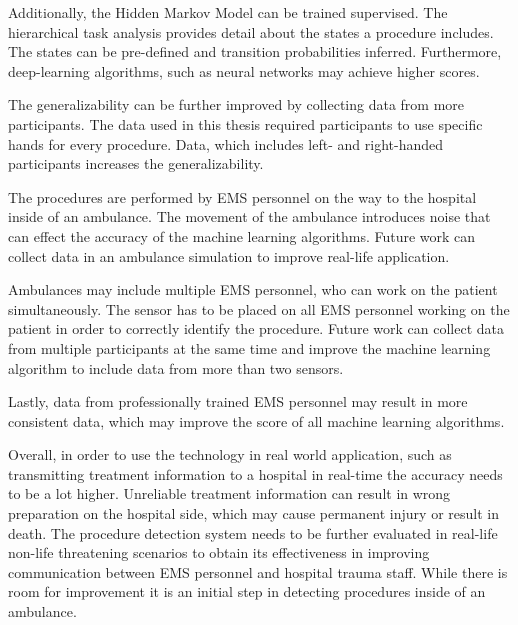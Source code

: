 \par Additionally, the Hidden Markov Model can be trained supervised. The hierarchical task analysis provides detail about the states a procedure includes. The states can be pre-defined and transition probabilities inferred. Furthermore, deep-learning algorithms, such as neural networks may achieve higher scores.
\par The generalizability can be further improved by collecting data from more participants. The data used in this thesis required participants to use specific hands for every procedure. Data, which includes left- and right-handed participants increases the generalizability.
\par The procedures are performed by EMS personnel on the way to the hospital inside of an ambulance. The movement of the ambulance introduces noise that can effect the accuracy of the machine learning algorithms. Future work can collect data in an ambulance simulation to improve real-life application.
\par Ambulances may include multiple EMS personnel, who can work on the patient simultaneously. The sensor has to be placed on all EMS personnel working on the patient in order to correctly identify the procedure. Future work can collect data from multiple participants at the same time and improve the machine learning algorithm to include data from more than two sensors.
\par Lastly, data from professionally trained EMS personnel may result in more consistent data, which may improve the score of all machine learning algorithms.
\par Overall, in order to use the technology in real world application, such as transmitting treatment information to a hospital in real-time the accuracy needs to be a lot higher. Unreliable treatment information can result in wrong preparation on the hospital side, which may cause permanent injury or result in death. The procedure detection system needs to be further evaluated in real-life non-life threatening scenarios to obtain its effectiveness in improving communication between EMS personnel and hospital trauma staff. While there is room for improvement it is an initial step in detecting procedures inside of an ambulance.